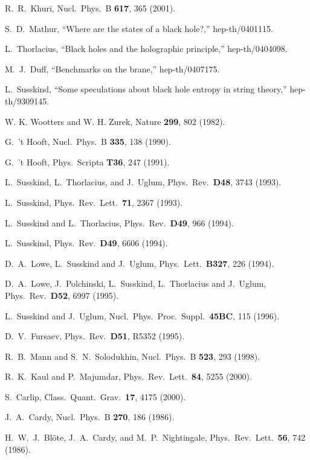 \documentclass[12pt]{article} \usepackage{latexsym} \textwidth 15cm
\begin{document}
\begin{thebibliography}{99}
 R.~R.~Khuri, Nucl.\ Phys.\ B {\bf 617}, 365 (2001).

 S.~D.~Mathur, ``Where are the states of a black hole?,''
  hep-th/0401115.
   
 L.~Thorlacius, ``Black holes and the holographic
principle,'' hep-th/0404098.

 M.~J.~Duff, ``Benchmarks on the brane,''
  hep-th/0407175.

 L.~Susskind, ``Some speculations about black hole
   entropy in string theory,'' hep-th/9309145.

 W. K. Wootters and W. H. Zurek, Nature {\bf 299}, 802
  (1982).

 G.~'t Hooft, Nucl.\ Phys.\ B {\bf 335}, 138 (1990).

 G.~'t Hooft, Phys.\ Scripta {\bf T36}, 247 (1991).

 L.~Susskind, L.~Thorlacius, and J.~Uglum, Phys.\ Rev.\
  {\bf D48}, 3743 (1993).

 L.~Susskind, Phys.\ Rev.\ Lett.\ {\bf 71}, 2367 (1993).

 L.~Susskind and L.~Thorlacius, Phys.\ Rev.\ {\bf D49},
  966 (1994).

 L.~Susskind, Phys.\ Rev.\ {\bf D49}, 6606 (1994).

 D.~A.~Lowe, L.~Susskind and J.~Uglum, Phys.\ Lett.\ 
  {\bf B327}, 226 (1994).

 D.~A.~Lowe, J.~Polchinski, L.~Susskind, L.~Thorlacius
  and J.~Uglum, Phys.\ Rev.\ {\bf D52}, 6997 (1995).

 L.~Susskind and J.~Uglum, Nucl.\ Phys.\ Proc.\ Suppl.\
  {\bf 45BC}, 115 (1996).

\bibitem{Fur} D.~V.~Fursaev, Phys.\ Rev.\ {\bf D51}, R5352 (1995).

 R.~B.~Mann and S.~N.~Solodukhin, Nucl.\ Phys.\ B {\bf
523}, 293 (1998).

\bibitem{KM} R.~K.~Kaul and P.~Majumdar, Phys.\ Rev.\ Lett.\ {\bf 84},
5255 (2000).

\bibitem{Carlip} S.~Carlip, Class.\ Quant.\ Grav.\ {\bf 17}, 4175
(2000).

\bibitem{Cardy} J.~A.~Cardy, Nucl.\ Phys.\ B {\bf 270}, 186 (1986).

 H.~W.~J.~Bl\"{o}te, J.~A.~Cardy, and M.~P.~Nightingale,
Phys.\ Rev.\ Lett.\ {\bf 56}, 742 (1986).


\end{thebibliography}
\end{document}
